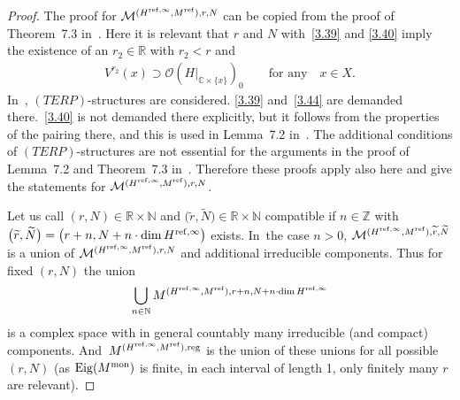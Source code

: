 \documentclass[10pt,a4paper]{amsart}
\numberwithin{equation}{section}
\numberwithin{figure}{section}
\newcommand{\N}{{\mathbb N}}
\newcommand{\Z}{{\mathbb Z}}
\newcommand{\C}{{\mathbb C}}
\newcommand{\R}{{\mathbb R}}
\newcommand{\MM}{{\mathcal M}}
\newcommand{\OO}{{\mathcal O}}
\newcommand{\www}{\widetilde}
\DeclareMathOperator{\Eig}{Eig}
\begin{document}
\begin{proof} The proof for $\MM^{(H^{{\rm ref},\infty},M^{\rm ref}),r,N}$
can be copied from the proof of Theorem~7.3 in~\cite{HS10}.
Here it is relevant that $r$ and $N$ with~\eqref{3.39} and
\eqref{3.40} imply the existence of an $r_2\in \R$ with $r_2<r$
and
\begin{gather}\label{3.44}
V^{r_2}(x)\supset \OO(H|_{\C\times\{x\}})_0
\qquad\text{for any}\quad x\in X.
\end{gather}
In~\cite{HS10}, $(TERP)$-structures are considered.
\eqref{3.39} and~\eqref{3.44} are demanded there.~\eqref{3.40} is not
demanded there explicitly, but it follows from the properties
of the pairing there, and this is used in Lemma~7.2 in~\cite{HS10}.
The additional conditions of $(TERP)$-structures are not
essential for the arguments in the proof of Lemma~7.2 and
Theorem~7.3 in~\cite{HS10}. Therefore these proofs apply
also here and give the statements for
$\MM^{(H^{{\rm ref},\infty},M^{\rm ref}),r,N}$.

Let us call $(r,N)\in\R\times \N$ and
$\big(\www r,\www N\big)\in\R\times \N$ compatible if $n\in\Z$
with $\big(\www r,\www N\big)=\big(r+n,\allowbreak N+n\cdot\dim H^{{\rm ref},\infty}\big)$ exists. In~the case $n>0$,
$\MM^{(H^{{\rm ref},\infty},M^{\rm ref}),\www r,\www N}$ is a union of
$\MM^{(H^{{\rm ref},\infty},M^{\rm ref}),r,N}$ and additional irreducible
components. Thus for fixed $(r,N)$ the union
\[
\bigcup_{n\in\N}M^{(H^{{\rm ref},\infty},M^{\rm ref}),r+n,N+n\cdot\dim H^{{\rm ref},\infty}}
\]
is a complex space with in general countably many irreducible
(and compact) components.
And~$M^{(H^{{\rm ref},\infty},M^{\rm ref}),{\rm reg}}$ is the union
of these unions for all possible $(r,N)$
(as $\Eig(M^{\rm mon})$ is finite, in each interval of length
1, only finitely many $r$ are relevant).
\end{proof}
\end{document}
